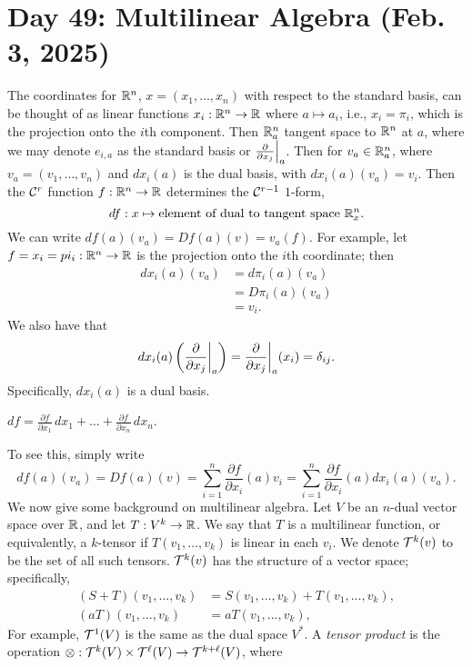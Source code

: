 \section{Day 49: Multilinear Algebra (Feb. 3, 2025)}
The coordinates for $\mathbb R^n$, $x = (x_1, \dots, x_n)$ with respect to the standard basis, can be thought of as linear functions $x_i : \mathbb R^n \to \mathbb R$ where $a \mapsto a_i$, i.e., $x_i = \pi_i$, which is the projection onto the $i$th component. Then $\mathbb R^n_a$ tangent space to $\mathbb R^n$ at $a$, where we may denote $e_{i,a}$ as the standard basis or $\restr{\frac{\partial}{\partial x_j}}{a}$. Then for $v_a \in \mathbb R^n_a$, where $v_a = (v_1, \dots, v_n)$ and $dx_i(a)$ is the dual basis, with $dx_i(a)(v_a) = v_i$. Then the $\mathcal C^r$ function $f : \mathbb R^n \to \mathbb R$ determines the $\mathcal C^{r-1}$ $1$-form,
\[ df : x \mapsto \text{element of dual to tangent space } \mathbb R^n_x. \]
We can write $df(a)(v_a) = Df(a)(v) = v_a(f)$. For example, let $f = x_i = pi_i : \mathbb R^n \to \mathbb R$ is the projection onto the $i$th coordinate; then
\begin{align*}
    dx_i(a)(v_a) &= d \pi_i(a) (v_a) \\
    &= D \pi_i(a) (v_a) \\
    &= v_i.
\end{align*}
We also have that
\[ dx_i(a) \left(\restr{\frac{\partial}{\partial x_j}}{a}\right) = \restr{\frac{\partial}{\partial x_j}}{a} (x_i) = \delta_{ij}. \]
Specifically, $dx_i(a)$ is a dual basis.
\begin{simplelemma}
    $df = \frac{\partial f}{\partial x_1} \, dx_1 + \dots + \frac{\partial f}{\partial x_n} \, dx_n$.
\end{simplelemma}
\noindent To see this, simply write
\[ df(a)(v_a) = Df(a)(v) = \sum_{i=1}^n \frac{\partial f}{\partial x_i}(a) v_i = \sum_{i=1}^n \frac{\partial f}{\partial x_i}(a) dx_i(a) (v_a). \]
We now give some background on multilinear algebra. Let $V$ be an $n$-dual vector space over $\mathbb R$, and let $T : V^k \to \mathbb R$. We say that $T$ is a multilinear function, or equivalently, a $k$-tensor if $T(v_1, \dots, v_k)$ is linear in each $v_i$. We denote $\mathcal T^k(v)$ to be the set of all such tensors. $\mathcal T^k(v)$ has the structure of a vector space; specifically,
\begin{align*}
    (S + T)(v_1, \dots, v_k) &= S(v_1, \dots, v_k) + T(v_1, \dots, v_k), \\
    (aT)(v_1, \dots, v_k) &= aT(v_1, \dots, v_k),
\end{align*}
For example, $\mathcal T^1(V)$ is the same as the dual space $V^\ast$. A \textit{tensor product} is the operation $\otimes: \mathcal T^k(V) \times \mathcal T^\ell(V) \to \mathcal T^{k + \ell}(V)$, where
